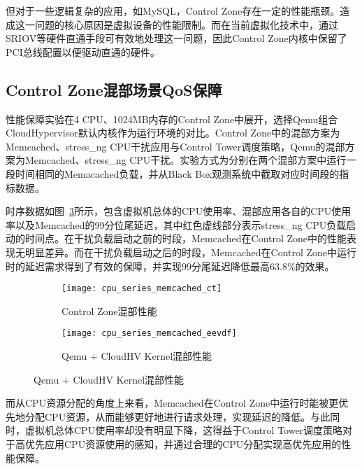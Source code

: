 但对于一些逻辑复杂的应用，如MySQL，Control Zone存在一定的性能瓶颈。造成这一问题的核心原因是虚拟设备的性能限制。而在当前虚拟化技术中，通过SRIOV等硬件直通手段可有效地处理这一问题，因此Control Zone内核中保留了PCI总线配置以便驱动直通的硬件。

\subsection{Control Zone混部场景QoS保障}

性能保障实验在4 CPU、1024MB内存的Control Zone中展开，选择Qemu组合CloudHypervisor默认内核作为运行环境的对比。Control Zone中的混部方案为Memcached、stress\_ng CPU干扰应用与Control Tower调度策略，Qemu的混部方案为Memcached、stress\_ng CPU干扰。实验方式为分别在两个混部方案中运行一段时间相同的Memacached负载，并从Black Box观测系统中截取对应时间段的指标数据。

时序数据如图~\ref{fig:cpu_series_memcached}所示，包含虚拟机总体的CPU使用率、混部应用各自的CPU使用率以及Memcached的99分位尾延迟，其中红色虚线部分表示stress\_ng CPU负载启动的时间点。在干扰负载启动之前的时段，Memcached在Control Zone中的性能表现无明显差异。而在干扰负载启动之后的时段，Memcached在Control Zone中运行时的延迟需求得到了有效的保障，并实现99分尾延迟降低最高63.8\%的效果。

\begin{figure}[H]
    \centering
    \begin{subfigure}[b]{0.49\textwidth}
        \texttt{[image: cpu\_series\_memcached\_ct]}
        \caption{\quad Control Zone混部性能}
        \label{fig:cpu_series_memcached_ct}
    \end{subfigure}
    \begin{subfigure}[b]{0.49\textwidth}
        \texttt{[image: cpu\_series\_memcached\_eevdf]}
        \caption{\quad Qemu + CloudHV Kernel混部性能}
        \label{fig:cpu_series_memcached_eevdf}
    \end{subfigure}
    \label{fig:cpu_series_memcached}
\end{figure}

而从CPU资源分配的角度上来看，Memcached在Control Zone中运行时能被更优先地分配CPU资源，从而能够更好地进行请求处理，实现延迟的降低。与此同时，虚拟机总体CPU使用率却没有明显下降，这得益于Control Tower调度策略对于高优先应用CPU资源使用的感知，并通过合理的CPU分配实现高优先应用的性能保障。



